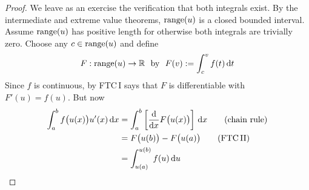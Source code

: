 \begin{proof}
	We leave as an exercise the verification that both integrals exist. By the intermediate and extreme value theorems, $\operatorname{range}(u)$ is a closed bounded interval. Assume $\operatorname{range}(u)$ has positive length for otherwise both integrals are trivially zero.\smallbreak
	Choose any $c\in\operatorname{range}(u)$ and define
	\[
		F:\range(u)\to\R\ \text{ by }\ F(v):=\int_c^vf(t)\,\dt
	\]
	Since $f$ is continuous, by FTC\,I says that $F$ is differentiable with $F'(u)=f(u)$. But now
	\begin{align*}
	\int_a^b f\bigl(u(x)\bigr)u'(x)\,{\mathrm{d} x} 
	&=\int_a^b \left[\frac{\mathrm{d} }{\mathrm{d} x}F\bigl(u(x)\bigr)\right]\,{\mathrm{d} x}  \tag{chain rule}\\
	&= F\bigl(u(b)\bigr)-F\bigl(u(a)\bigr) \tag{FTC\,II}\\
	&=\int_{u(a)}^{u(b)}f(u)\,{\mathrm{d} u}\tag*{\qedhere}
	\end{align*}
\end{proof}


\goodbreak


